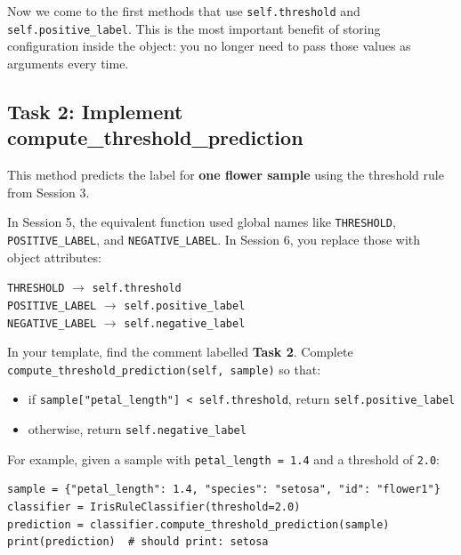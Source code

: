 Now we come to the first methods that use \texttt{self.threshold} and \texttt{self.positive\_label}.
This is the most important benefit of storing configuration inside the object: you no longer need to pass those values as arguments every time.

\subsection{Task 2: Implement compute\_threshold\_prediction}

\begin{tcolorbox}[title=Task 2: Implement compute\_threshold\_prediction]
This method predicts the label for \textbf{one flower sample} using the threshold rule from Session 3.

\medskip
\noindent
In Session 5, the equivalent function used global names like \texttt{THRESHOLD}, \texttt{POSITIVE\_LABEL}, and \texttt{NEGATIVE\_LABEL}.
In Session 6, you replace those with object attributes:

\begin{center}
\texttt{THRESHOLD} $\rightarrow$ \texttt{self.threshold} \\
\texttt{POSITIVE\_LABEL} $\rightarrow$ \texttt{self.positive\_label} \\
\texttt{NEGATIVE\_LABEL} $\rightarrow$ \texttt{self.negative\_label}
\end{center}

\medskip
\noindent
In your template, find the comment labelled \textbf{Task 2}.
Complete \texttt{compute\_threshold\_prediction(self, sample)} so that:
\begin{itemize}\setlength{\itemsep}{2pt}
    \item if \texttt{sample["petal\_length"] < self.threshold}, return \texttt{self.positive\_label}
    \item otherwise, return \texttt{self.negative\_label}
\end{itemize}
\end{tcolorbox}

\noindent
For example, given a sample with \texttt{petal\_length = 1.4} and a threshold of \texttt{2.0}:

\begin{verbatim}
sample = {"petal_length": 1.4, "species": "setosa", "id": "flower1"}
classifier = IrisRuleClassifier(threshold=2.0)
prediction = classifier.compute_threshold_prediction(sample)
print(prediction)  # should print: setosa
\end{verbatim}


